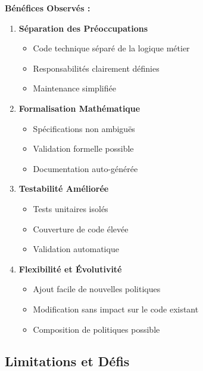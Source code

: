 \documentclass[12pt,a4paper]{article}
\begin{document}
    \begin{policybox}
        \textbf{Bénéfices Observés :}

        \begin{enumerate}
            \item \textbf{Séparation des Préoccupations}
            \begin{itemize}
                \item Code technique séparé de la logique métier
                \item Responsabilités clairement définies
                \item Maintenance simplifiée
            \end{itemize}

            \item \textbf{Formalisation Mathématique}
            \begin{itemize}
                \item Spécifications non ambiguës
                \item Validation formelle possible
                \item Documentation auto-générée
            \end{itemize}

            \item \textbf{Testabilité Améliorée}
            \begin{itemize}
                \item Tests unitaires isolés
                \item Couverture de code élevée
                \item Validation automatique
            \end{itemize}

            \item \textbf{Flexibilité et Évolutivité}
            \begin{itemize}
                \item Ajout facile de nouvelles politiques
                \item Modification sans impact sur le code existant
                \item Composition de politiques possible
            \end{itemize}
        \end{enumerate}
    \end{policybox}

    \subsection{Limitations et Défis}
\end{document}
